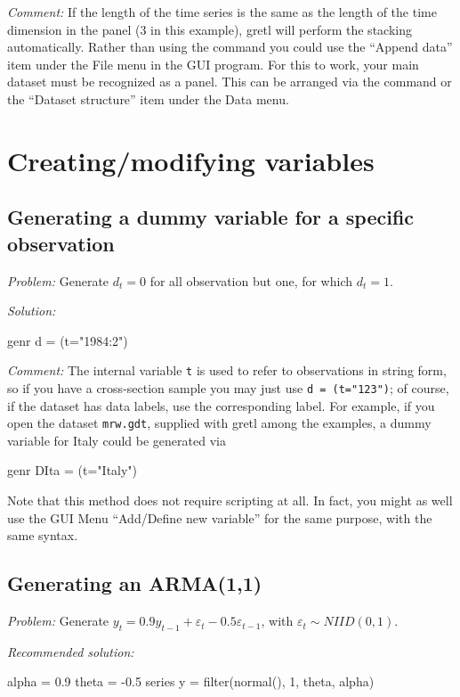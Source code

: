 \emph{Comment:} If the length of the time series is the same as the
length of the time dimension in the panel (3 in this example), gretl
will perform the stacking automatically.  Rather than using the
 command you could use the ``Append data'' item under
the \textsf{File} menu in the GUI program.  For this to work, your
main dataset must be recognized as a panel.  This can be arranged via
the  command or the ``Dataset structure'' item under
the \textsf{Data} menu.


\section{Creating/modifying variables}

\subsection{Generating a dummy variable for a specific observation}

\emph{Problem:} Generate $d_t = 0$ for all observation but one, for
which $d_t = 1$.

\emph{Solution:}
\begin{code}
  genr d = (t="1984:2")
\end{code}

\emph{Comment:} The internal variable \texttt{t} is used to refer to
observations in string form, so if you have a cross-section sample you
may just use \texttt{d = (t="123")}; of course, if the dataset has
data labels, use the corresponding label. For example, if you open the
dataset \texttt{mrw.gdt}, supplied with gretl among the
examples, a dummy variable for Italy could be generated via
\begin{code}
  genr DIta = (t="Italy")
\end{code}

Note that this method does not require scripting at all. In fact, you
might as well use the GUI Menu ``Add/Define new variable'' for the
same purpose, with the same syntax.

\subsection{Generating an ARMA(1,1)}

\emph{Problem:} Generate $y_t = 0.9 y_{t-1} + \varepsilon_t - 0.5
\varepsilon_{t-1}$, with $\varepsilon_t \sim N\!I\!I\!D(0,1)$.

\emph{Recommended solution:}
\begin{code}
alpha = 0.9
theta = -0.5
series y = filter(normal(), {1, theta}, alpha)
\end{code}


